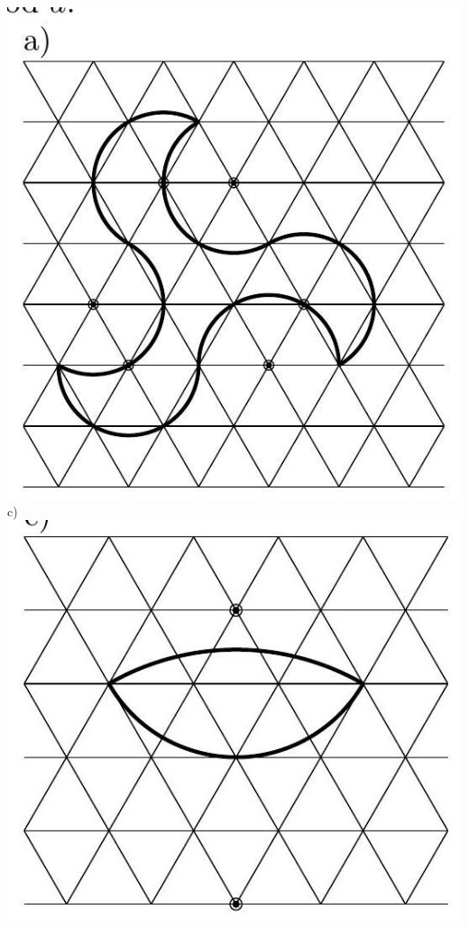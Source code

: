 \documentclass[10pt]{article}
\begin{document}
\begin{enumerate}
\includegraphics[max width=\textwidth, center]{2024_11_21_e9b4faa005d5be2cc318g-063(5)}\\
c)\\
\includegraphics[max width=\textwidth, center]{2024_11_21_e9b4faa005d5be2cc318g-063(4)}\\

\end{enumerate}
\end{document}
